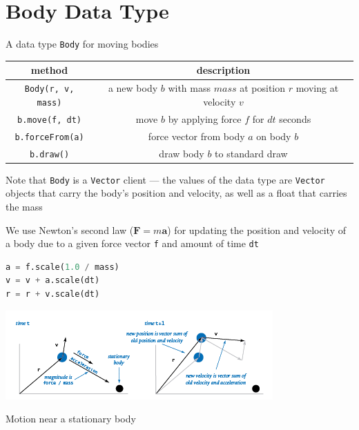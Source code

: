 \documentclass[8pt,a4paper,compress,handout]{beamer}
\begin{document}
\section{Body Data Type}
\begin{frame}[fragile]
A data type \lstinline{Body} for moving bodies
\begin{center}
\begin{tabular}{cc}
method & description \\ \hline
\lstinline$Body(r, v, mass)$ & a new body $b$ with mass $mass$ at position $r$ moving at velocity $v$ \\
\lstinline$b.move(f, dt)$ & move $b$ by applying force $f$ for $dt$ seconds \\
\lstinline$b.forceFrom(a)$ & force vector from body $a$ on body $b$ \\
\lstinline$b.draw()$ & draw body $b$ to standard draw
\end{tabular} 
\end{center}

\bigskip

Note that \lstinline{Body} is a \lstinline{Vector} client --- the values of the data type are \lstinline{Vector} objects that carry the body's position and velocity, as well as a float that carries the mass

\bigskip

We use Newton's second law ($\mathbf{F}=m\mathbf{a}$) for updating the position and velocity of a body due to a given force vector \lstinline{f} and amount of time \lstinline{dt}
\begin{lstlisting}[language=Python]
a = f.scale(1.0 / mass)
v = v + a.scale(dt)
r = r + v.scale(dt)
\end{lstlisting}

\begin{center}
\includegraphics[scale=0.45]{figures/vector_add_acc.png}

\smallskip

\tiny Motion near a stationary body
\end{center}
\end{frame}
\end{document}
